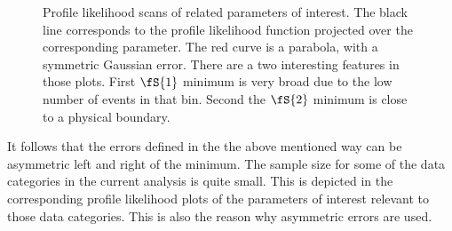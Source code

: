 \begin{figure}[!t]
  \centering
  \begin{subfigure}{0.5\textwidth}
    \scalebox{0.57}{}
    \caption{}
    \label{nll_ASMag2_bin1}
  \end{subfigure}%
  \hfill%
  \begin{subfigure}{0.5\textwidth}
    \scalebox{0.57}{}
    \caption{}
    \label{nll_ASPhase_bin1}
  \end{subfigure}
  \begin{subfigure}{0.5\textwidth}
    \scalebox{0.57}{}
    \caption{}
    \label{nll_ASMag2_bin1}
  \end{subfigure}%
  \hfill%
  \begin{subfigure}{0.5\textwidth}
    \scalebox{0.57}{}
    \caption{}
    \label{nll_ASPhase_bin3}
  \end{subfigure}
  \caption{Profile likelihood scans of \swave related parameters of interest. The black line corresponds to the profile likelihood
         function projected over the corresponding parameter. The red curve is a parabola, with a symmetric Gaussian
         error. There are a two interesting features in those plots. First $\fS{1}$ minimum is very broad due to the
         low number of events in that \mkpi bin. Second the $\fS{2}$ minimum is close to a physical boundary.}
\end{figure}

It follows that the errors defined in the the above mentioned way can be asymmetric left and right of the minimum.
The sample size for some of the data categories in the current analysis is quite small. This is depicted in the corresponding profile
likelihood plots of the parameters of interest relevant to those data categories. This is also the reason why asymmetric errors are used.

